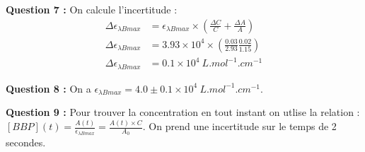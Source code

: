 \documentclass[12pt]{article}
\begin{document}
\textbf{Question 7 :} On calcule l'incertitude :
\begin{align*}
    \Delta  \epsilon_{\lambda Bmax} &=  \epsilon_{\lambda Bmax} \times \left(\frac{\Delta C}{C} + \frac{\Delta A}{A} \right) \\
    \Delta  \epsilon_{\lambda Bmax} &=  3.93 \times 10^4 \times \left( \frac{0.03}{2.93} \frac{0.02}{1.15}  \right) \\
    \Delta  \epsilon_{\lambda Bmax} &= 0.1 \times 10^4 \ L.mol^{-1}.cm^{-1}
\end{align*}

\textbf{Question 8 :} On a $\epsilon_{\lambda Bmax} =4.0 \pm 0.1 \times 10^4 \ L.mol^{-1}.cm^{-1}$.

\textbf{Question 9 :} Pour trouver la concentration en tout instant on utlise la relation : $[BBP](t)=\frac{A(t)}{\epsilon_{\lambda Bmax}}=\frac{A(t)\times C}{A_0}$.
On prend une incertitude sur le temps de 2 secondes.
\end{document}
